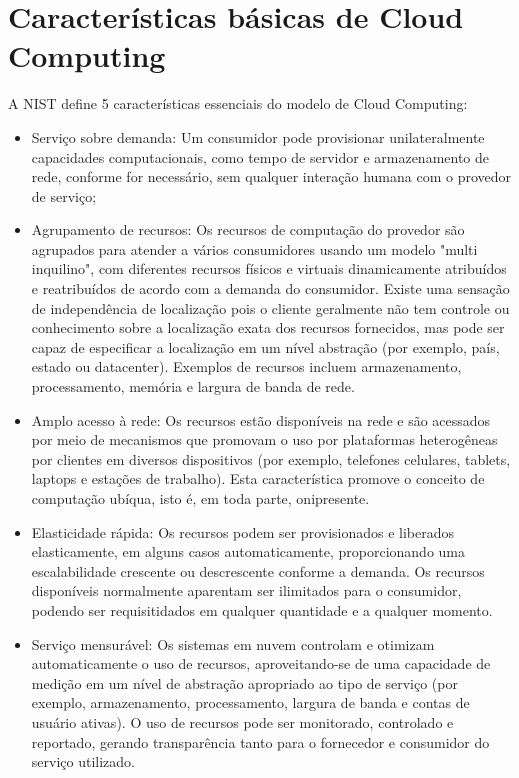 \section{Características básicas de Cloud Computing}
	A NIST define 5 características essenciais do modelo de Cloud Computing:
	\begin{itemize}
		\item
			Serviço sobre demanda: Um consumidor pode provisionar unilateralmente capacidades computacionais, como tempo de servidor e armazenamento de rede, conforme for necessário, sem qualquer interação humana com o provedor de serviço;
		\item
			Agrupamento de recursos: Os recursos de computação do provedor são agrupados para atender a vários consumidores usando um modelo "multi inquilino", com diferentes recursos físicos e virtuais dinamicamente
			atribuídos e reatribuídos de acordo com a demanda do consumidor. Existe uma sensação de independência de localização pois o cliente geralmente não tem controle ou conhecimento sobre a localização exata dos recursos fornecidos, mas pode ser capaz de especificar a localização em um nível
			abstração (por exemplo, país, estado ou datacenter). Exemplos de recursos incluem armazenamento, processamento, memória e largura de banda de rede.
		\item
			Amplo acesso à rede: Os recursos estão disponíveis na rede e são acessados por meio de mecanismos que promovam o uso por plataformas heterogêneas por clientes em diversos dispositivos (por exemplo, telefones celulares, tablets, laptops e estações de trabalho). Esta característica promove o conceito de computação ubíqua, isto é, em toda parte, onipresente.
		\item
			Elasticidade rápida: Os recursos podem ser provisionados e liberados elasticamente, em alguns casos automaticamente, proporcionando uma escalabilidade crescente ou descrescente conforme a demanda. Os recursos disponíveis normalmente aparentam ser ilimitados para o consumidor, podendo ser requisitidados em qualquer quantidade e a qualquer momento.
		\item
			Serviço mensurável: Os sistemas em nuvem controlam e otimizam automaticamente o uso de recursos, aproveitando-se de uma capacidade de medição em um nível de abstração apropriado ao tipo de serviço (por exemplo, armazenamento, processamento, largura de banda e contas de usuário ativas). O uso de recursos pode ser monitorado, controlado e reportado, gerando transparência tanto para o fornecedor e consumidor do serviço utilizado.
	\end{itemize}

